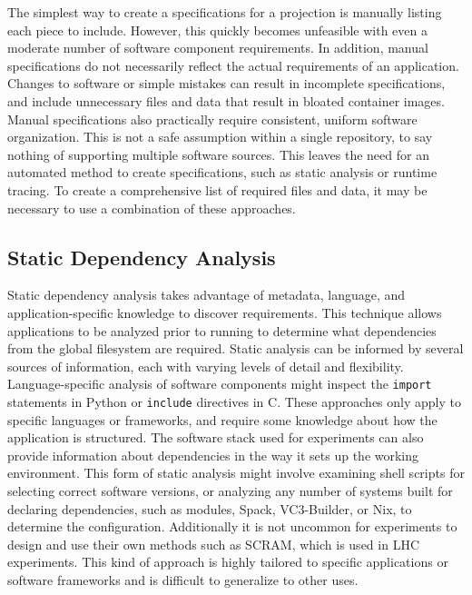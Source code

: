 \documentclass[sigconf]{acmart}
\begin{document}
The simplest way to create a specifications for a projection is manually listing each piece to include.
However, this quickly becomes unfeasible with even a moderate number of software component requirements.
In addition, manual specifications do not necessarily reflect the actual requirements of an application.
Changes to software or simple mistakes can result in incomplete specifications,
and include unnecessary files and data that result in bloated container images.
Manual specifications also practically require consistent, uniform software organization.
This is not a safe assumption within a single repository,
to say nothing of supporting multiple software sources.
This leaves the need for an automated method to create
specifications, such as 
 static analysis or runtime tracing.
To create a comprehensive list of required files and data,
it may be necessary to use a combination of these approaches.

\subsection{Static Dependency Analysis}
    
Static dependency analysis takes advantage of metadata, language, and application-specific knowledge to
discover requirements.
This technique allows applications to be analyzed
prior to running to determine what dependencies from the global filesystem are required.
Static analysis can be informed by several sources of information,
each with varying levels of detail and flexibility.
Language-specific analysis of software components might inspect the \texttt{import} statements in Python or
\texttt{include} directives in C.
These approaches only apply to specific languages or frameworks,
and require some knowledge about how the application is structured.
The software stack used for experiments can also provide information about dependencies in the way it sets up the working environment.
This form of static analysis might involve examining shell scripts for selecting  correct 
software versions, or 
analyzing any number of systems built for 
declaring dependencies, such as 
modules\cite{McLay:2011:BPD:2063348.2063360},
Spack\cite{Gamblin:2015:SPM:2807591.2807623},
VC3-Builder\cite{tovar-ic2e-2018},
or Nix\cite{Dolstra2008NixOSAP},
to determine the configuration.
Additionally it is not uncommon for experiments 
to design and use their own methods such as
SCRAM\cite{DBLP:journals/corr/cs-OH-0306014},
which is used in LHC experiments.
This kind of approach is highly tailored to specific applications or software frameworks and is difficult to generalize to other uses.
\end{document}
